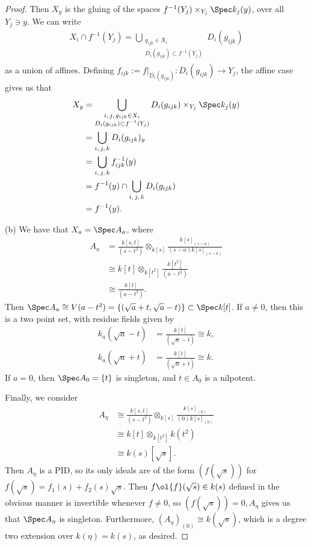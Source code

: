 \documentclass[12pt]{amsart}
\begin{document}
\begin{proof}
  Then $X_y$ is the gluing of the spaces $f^{-1}(Y_j)\times_{Y_j} \Spec k_j(y)$, over all $Y_j\ni y$.
  We can write 
  \begin{align*}
    X_i\cap f^{-1}(Y_j)= \bigcup_{\substack{g_{i j k}\in X_i \\ D_i(g_{i j k})\subset f^{-1}(Y_j)}} D_i(g_{ij k})
  \end{align*}
  as a union of affines.
  Defining $f_{i j k}:=f|_{D_i(g_{i j k})}:D_i(g_{ i j k})\to Y_j$, the affine case gives us that
  \begin{align*}
    X_y &= \bigcup_{\substack{i,\,j,\, g_{ij k}\in X_i \\ D_i(g_{i j k})\subset f^{-1}(Y_j)}}
    D_i(g_{i j k})\times_{Y_j} \Spec k_j(y) \\
        &= \bigcup_{i,\, j,\, k} D_i(g_{i j k})_y \\
        &= \bigcup_{i,\, j,\, k} f_{i j k}^{-1}(y) \\
        &= f^{-1}(y)\cap \bigcup_{i, \, j, \,k} D_i(g_{ij k}) \\
        &= f^{-1}(y).
  \end{align*}

  (b) We have that $X_a=\Spec A_a$, where
  \begin{align*}
    A_a &= \frac{k[s,t]}{(s-t^2)}\otimes_{k[s]}\frac{k[s]_{(s-a)}}{(s-a)k[s]_{(s-a)}} \\
        &\cong k[t]\otimes_{k[t^2]}\frac{k[t^2]}{(a-t^2)} \\
        &\cong \frac{k[t]}{(a-t^2)}.
  \end{align*}
  Then $\Spec A_a\cong V(a-t^2)=\{(\sqrt{a}+ t,\sqrt{a}-t)\}\subset \Spec k[t]$.
  If $a\neq 0$, then this is a two point set, with residue fields given by
  \begin{align*}
    k_a(\sqrt{a}-t) &=\frac{k[t]}{(\sqrt{a}-t)}\cong k,\\
    k_a(\sqrt{a}+t) &=\frac{k[t]}{(\sqrt{a}+t)}\cong k.
  \end{align*}
  If $a=0$, then $\Spec A_0=\{t\}$ is singleton, and $t\in A_0$ is a nilpotent.

  Finally, we consider 
  \begin{align*}
    A_\eta &\cong \frac{k[s,t]}{(s-t^2)}\otimes_{k[s]}\frac{k[s]_{(0)}}{(0)k[s]_{(0)}} \\
           &\cong k[t]\otimes_{k[t^2]}k(t^2) \\
           &\cong k(s)[\sqrt{s}].
  \end{align*}
  Then $A_\eta$ is a PID, so its only ideals are of the form $(f(\sqrt{s}))$ for $f(\sqrt{s})= f_1(s)+f_2(s)\sqrt{s}$.
  Then $f\ol{f}(\sqrt{s})\in k(s)$ defined in the obvious manner is invertible whenever $f\neq 0$, so $(f(\sqrt{s}))=0,A_\eta$ gives us that $\Spec A_\eta$ is singleton.
  Furthermore, $(A_\eta)_{(0)}\cong k(\sqrt{s})$, which is a degree two extension over $k(\eta)=k(s)$, as desired.
\end{proof}
\end{document}

